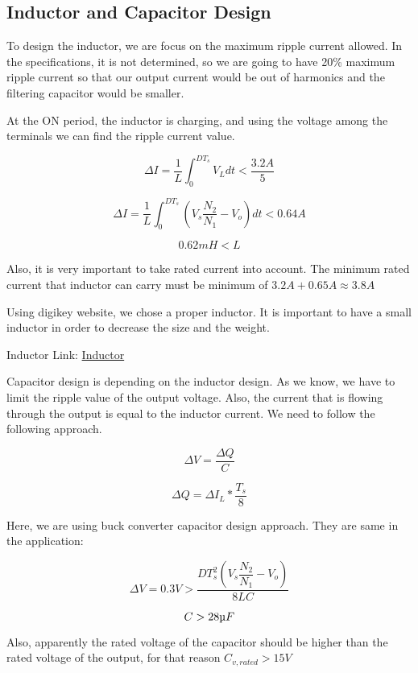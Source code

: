 \subsection{Inductor and Capacitor Design}

To design the inductor, we are focus on the maximum ripple current allowed. In the specifications, it is not determined, so we are going to have 20\% maximum ripple current so that our output current would be out of harmonics and the filtering capacitor would be smaller.

At the ON period, the inductor is charging, and using the voltage among the terminals we can find the ripple current value.

$$ \Delta I = \frac{1}{L} \int_{0}^{DT_s} V_L dt < \dfrac{3.2A}{5} $$

$$ \Delta I = \frac{1}{L} \int_{0}^{DT_s} (V_s \frac{N_2}{N_1} - V_o) dt < 0.64A$$

$$ 0.62mH < L$$

Also, it is very important to take rated current into account. The minimum rated current that inductor can carry must be minimum of $3.2A + 0.65A \approx 3.8A$

Using digikey website, we chose a proper inductor. It is important to have a small inductor in order to decrease the size and the weight.

Inductor Link: \href{https://www.digikey.com/product-detail/en/bourns-inc/2300LL-681-H-RC/2300LL-681-H-RC-ND/725890}{Inductor}

Capacitor design is depending on the inductor design. As we know, we have to limit the ripple value of the output voltage. Also, the current that is flowing through the output is equal to the inductor current. We need to follow the following approach.

\begin{equation}
    \Delta V = \dfrac{\Delta Q}{C}
\end{equation}

\begin{equation}
    \Delta Q = \Delta I_L * \dfrac{T_s}{8}
\end{equation}

Here, we are using buck converter capacitor design approach. They are same in the application:

$$ \Delta V = 0.3V > \dfrac{DT_s^2 (V_s \dfrac{N_2}{N_1} - V_o) }{8LC}$$

$$ C > 28 \micro F$$

Also, apparently the rated voltage of the capacitor should be higher than the rated voltage of the output, for that reason $C_{v,rated} > 15V$

